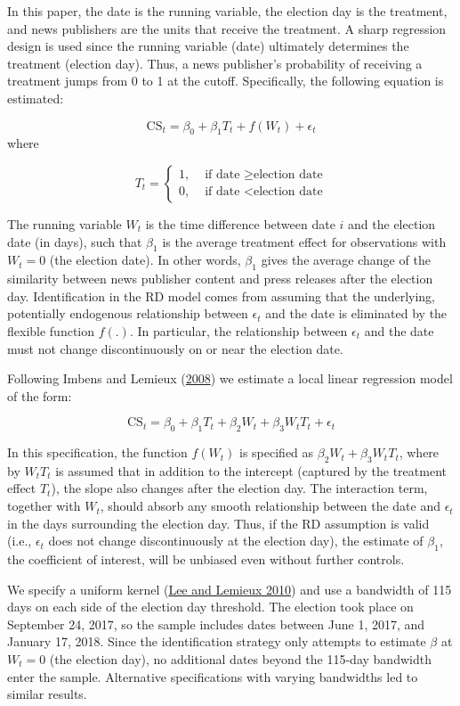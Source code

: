 \documentclass[
  12pt,
]{article}
\begin{document}
In this paper, the date is the running variable, the election day is the
treatment, and news publishers are the units that receive the treatment.
A sharp regression design is used since the running variable (date)
ultimately determines the treatment (election day). Thus, a news
publisher's probability of receiving a treatment jumps from 0 to 1 at
the cutoff. Specifically, the following equation is estimated:

\[
\text{CS}_{t}=\beta_0+\beta_1T_t+f(W_t)+\epsilon_t
\] where

\[
T_t = 
\begin{cases}
1, & \text{ if date } \geq \text{election date} \\
0, & \text{ if date } < \text{election date}
\end{cases}
\]

The running variable \(W_t\) is the time difference between date \(i\)
and the election date (in days), such that \(\beta_1\) is the average
treatment effect for observations with \(W_t = 0\) (the election date).
In other words, \(\beta_1\) gives the average change of the similarity
between news publisher content and press releases after the election
day. Identification in the RD model comes from assuming that the
underlying, potentially endogenous relationship between \(\epsilon_t\)
and the date is eliminated by the flexible function \(f(.)\). In
particular, the relationship between \(\epsilon_t\) and the date must
not change discontinuously on or near the election date.

Following Imbens and Lemieux
(\protect\hyperlink{ref-imbens_regression_2008}{2008}) we estimate a
local linear regression model of the form:

\[
\text{CS}_{t}=\beta_0+\beta_1T_t+\beta_2W_t+\beta_3W_tT_t+\epsilon_t
\]

In this specification, the function \(f(W_t)\) is specified as
\(\beta_2W_t+\beta_3W_tT_t\), where by \(W_tT_t\) is assumed that in
addition to the intercept (captured by the treatment effect \(T_t\)),
the slope also changes after the election day. The interaction term,
together with \(W_t\), should absorb any smooth relationship between the
date and \(\epsilon_t\) in the days surrounding the election day. Thus,
if the RD assumption is valid (i.e., \(\epsilon_t\) does not change
discontinuously at the election day), the estimate of \(\beta_1\), the
coefficient of interest, will be unbiased even without further controls.

We specify a uniform kernel
(\protect\hyperlink{ref-lee_regression_2010}{Lee and Lemieux 2010}) and
use a bandwidth of 115 days on each side of the election day threshold.
The election took place on September 24, 2017, so the sample includes
dates between June 1, 2017, and January 17, 2018. Since the
identification strategy only attempts to estimate \(\beta\) at \(W_t=0\)
(the election day), no additional dates beyond the 115-day bandwidth
enter the sample. Alternative specifications with varying bandwidths led
to similar results.
\end{document}
